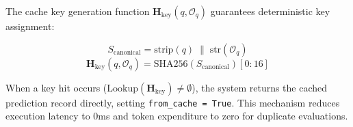 The cache key generation function $\mathbf{H}_{\text{key}}(q, \mathcal{O}_q)$ guarantees deterministic key assignment:

\begin{equation}
    S_{\text{canonical}} = \text{strip}(q) \;\|\; \text{str}(\mathcal{O}_q)
\end{equation}
\begin{equation}
    \mathbf{H}_{\text{key}}(q, \mathcal{O}_q) = \text{SHA256}(S_{\text{canonical}})[0:16]
\end{equation}

When a key hit occurs ($\text{Lookup}(\mathbf{H}_{\text{key}}) \neq \emptyset$), the system returns the cached prediction record directly, setting \texttt{from\_cache = True}. This mechanism reduces execution latency to 0ms and token expenditure to zero for duplicate evaluations.
